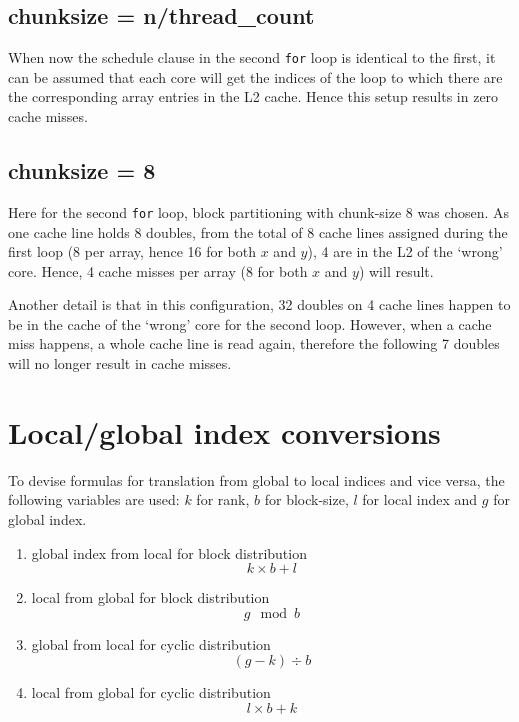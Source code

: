 \documentclass[a4paper,11pt,twoside]{article}
\begin{document}
\subsection*{chunksize = n/thread\_count}
When now the schedule clause in the second \verb+for+ loop is identical to the first, it can be assumed that each core will get the indices of the loop to which there are the corresponding array entries in the L2 cache. Hence this setup results in zero cache misses.
 
\subsection*{chunksize = 8}
Here for the second \verb+for+ loop, block partitioning with chunk-size 8 was chosen. As one cache line holds 8 doubles, from the total of 8 cache lines assigned during the first loop (8 per array, hence 16 for both $x$ and $y$), 4 are in the L2 of the `wrong' core. Hence, 4 cache misses per array (8 for both $x$ and $y$) will result. 

Another detail is that in this configuration, 32 doubles on 4 cache lines happen to be in the cache of the `wrong' core for the second loop. However, when a cache miss happens, a whole cache line is read again, therefore the following 7 doubles will no longer result in cache misses.  

\section{Local/global index conversions}
To devise formulas for translation from global to local indices and vice versa, the following variables are used: $k$ for rank, $b$ for block-size, $l$ for local index and $g$ for global index.

\begin{enumerate}[label={\alph*)}]
\item global index from local for block distribution
\begin{equation*}
k \times b + l
\end{equation*}
\item local from global for block distribution
\begin{equation*}
g \mod b
\end{equation*}
\item global from local for cyclic distribution
\begin{equation*}
(g-k) \div b
\end{equation*}
\item local from global for cyclic distribution
\begin{equation*}
l \times b + k
\end{equation*}
\end{enumerate}
\end{document}
